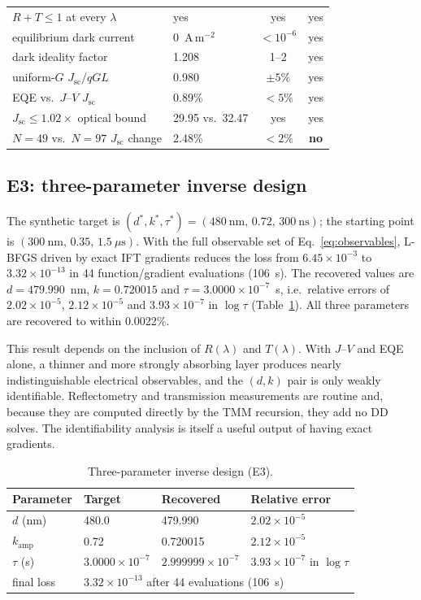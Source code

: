 \documentclass[preprint,12pt]{elsarticle}
\begin{document}
\begin{table}[t]
\begin{tabular}{llcc}
$R+T\le1$ at every $\lambda$ & yes & yes & yes \\
equilibrium dark current & 0~A\,m$^{-2}$ & $<10^{-6}$ & yes \\
dark ideality factor & 1.208 & 1--2 & yes \\
uniform-$G$ $J_{\mathrm{sc}}/qGL$ & 0.980 & $\pm5\%$ & yes \\
EQE vs.\ $J$--$V$ $J_{\mathrm{sc}}$ & 0.89\% & $<5\%$ & yes \\
$J_{\mathrm{sc}}\le 1.02\times$ optical bound & 29.95 vs.\ 32.47 & yes & yes \\
$N=49$ vs.\ $N=97$ $J_{\mathrm{sc}}$ change & 2.48\% & $<2\%$ & \textbf{no} \\
\bottomrule
\end{tabular}
\end{table}

\subsection{E3: three-parameter inverse design}
\label{sec:e3}

The synthetic target is
$(d^{*},k^{*},\tau^{*})=(480~\mathrm{nm},\,0.72,\,300~\mathrm{ns})$; the
starting point is $(300~\mathrm{nm},\,0.35,\,1.5~\mu\mathrm{s})$. With the
full observable set of Eq.~\eqref{eq:observables}, L-BFGS driven by exact IFT
gradients reduces the loss from $6.45\times10^{-3}$ to
$3.32\times10^{-13}$ in 44 function/gradient evaluations (106~s). The
recovered values are $d=479.990$~nm, $k=0.720015$ and
$\tau=3.0000\times10^{-7}$~s, i.e.\ relative errors of
$2.02\times10^{-5}$, $2.12\times10^{-5}$ and
$3.93\times10^{-7}$ in $\log\tau$ (Table~\ref{tab:inverse}). All three
parameters are recovered to within 0.0022\%.

This result depends on the inclusion of $R(\lambda)$ and $T(\lambda)$. With
$J$--$V$ and EQE alone, a thinner and more strongly absorbing layer produces
nearly indistinguishable electrical observables, and the $(d,k)$ pair is
only weakly identifiable. Reflectometry and transmission measurements are
routine and, because they are computed directly by the TMM recursion, they
add no DD solves. The identifiability analysis is itself a useful output of
having exact gradients.

\begin{table}[t]
\caption{Three-parameter inverse design (E3).}
\label{tab:inverse}
\centering
\small
\begin{tabular}{llll}
\toprule
Parameter & Target & Recovered & Relative error \\
\midrule
$d$ (nm) & 480.0 & 479.990 & $2.02\times10^{-5}$ \\
$k_{\mathrm{amp}}$ & 0.72 & 0.720015 & $2.12\times10^{-5}$ \\
$\tau$ (s) & $3.0000\times10^{-7}$ & $2.999999\times10^{-7}$ & $3.93\times10^{-7}$ in $\log\tau$ \\
\midrule
final loss & \multicolumn{3}{l}{$3.32\times10^{-13}$ after 44 evaluations (106~s)} \\
\bottomrule
\end{tabular}
\end{table}
\end{document}
